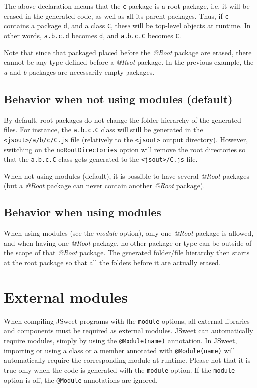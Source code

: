 \documentclass[a4paper]{report}
\begin{document}
The above declaration means that the \texttt{c} package is a root package, i.e. it will be erased in the generated code, as well as all its parent packages. Thus, if \texttt{c} contains a package \texttt{d}, and a class \texttt{C}, these will be top-level objects at runtime. In other words, \texttt{a.b.c.d} becomes \texttt{d}, and \texttt{a.b.c.C} becomes \texttt{C}.

Note that since that packaged placed before the \emph{@Root} package are erased, there cannot be any type defined before a \emph{@Root} package. In the previous example, the \emph{a} and \emph{b} packages are necessarily empty packages.

\subsection{Behavior when not using modules (default)}

By default, root packages do not change the folder hierarchy of the generated files. For instance, the \texttt{a.b.c.C} class will still be generated in the \texttt{<jsout>/a/b/c/C.js} file (relatively to the \texttt{<jsout>} output directory). However, switching on the \texttt{noRootDirectories} option will remove the root directories so that the \texttt{a.b.c.C} class gets generated to the \texttt{<jsout>/C.js} file.

When not using modules (default), it is possible to have several \emph{@Root} packages (but a \emph{@Root} package can never contain another \emph{@Root} package).

\subsection{Behavior when using modules}

When using modules (see the \emph{module} option), only one \emph{@Root} package is allowed, and when having one \emph{@Root} package, no other package or type can be outside of the scope of that \emph{@Root} package. The generated folder/file hierarchy then starts at the root package so that all the folders before it are actually erased.

\section{External modules}

When compiling JSweet programs with the \texttt{module} options, all external libraries and components must be required as external modules. JSweet can automatically require modules, simply by using the \texttt{@Module(name)} annotation. In JSweet, importing or using a class or a member annotated with \texttt{@Module(name)} will automatically require the corresponding module at runtime. Please not that it is true only when the code is generated with the \texttt{module} option. If the \texttt{module} option is off, the \texttt{@Module} annotations are ignored.
\end{document}
